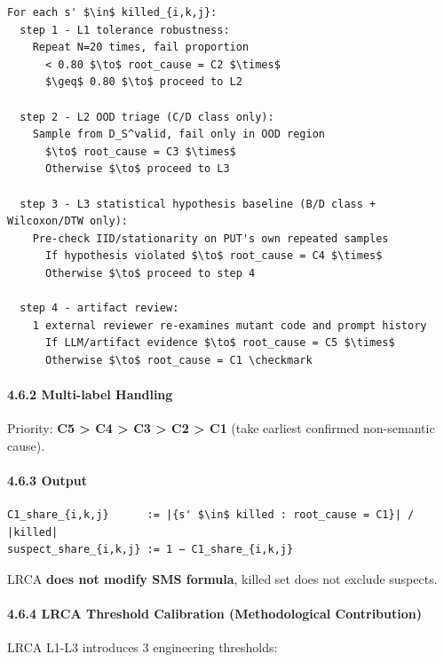 \documentclass[review,12pt,authoryear]{elsarticle}
\begin{document}
\begin{verbatim}
For each s' $\in$ killed_{i,k,j}:
  step 1 - L1 tolerance robustness:
    Repeat N=20 times, fail proportion
      < 0.80 $\to$ root_cause = C2 $\times$
      $\geq$ 0.80 $\to$ proceed to L2

  step 2 - L2 OOD triage (C/D class only):
    Sample from D_S^valid, fail only in OOD region
      $\to$ root_cause = C3 $\times$
      Otherwise $\to$ proceed to L3

  step 3 - L3 statistical hypothesis baseline (B/D class + Wilcoxon/DTW only):
    Pre-check IID/stationarity on PUT's own repeated samples
      If hypothesis violated $\to$ root_cause = C4 $\times$
      Otherwise $\to$ proceed to step 4

  step 4 - artifact review:
    1 external reviewer re-examines mutant code and prompt history
      If LLM/artifact evidence $\to$ root_cause = C5 $\times$
      Otherwise $\to$ root_cause = C1 \checkmark
\end{verbatim}

\paragraph{4.6.2 Multi-label Handling}\label{multi-label-handling}

Priority: \textbf{C5 \textgreater{} C4 \textgreater{} C3 \textgreater{}
C2 \textgreater{} C1} (take earliest confirmed non-semantic cause).

\paragraph{4.6.3 Output}\label{output}

\begin{verbatim}
C1_share_{i,k,j}      := |{s' $\in$ killed : root_cause = C1}| / |killed|
suspect_share_{i,k,j} := 1 − C1_share_{i,k,j}
\end{verbatim}

LRCA \textbf{does not modify SMS formula}, killed set does not exclude
suspects.

\paragraph{4.6.4 LRCA Threshold Calibration (Methodological
Contribution)}\label{lrca-threshold-calibration-methodological-contribution}

LRCA L1-L3 introduces 3 engineering thresholds:
\end{document}
